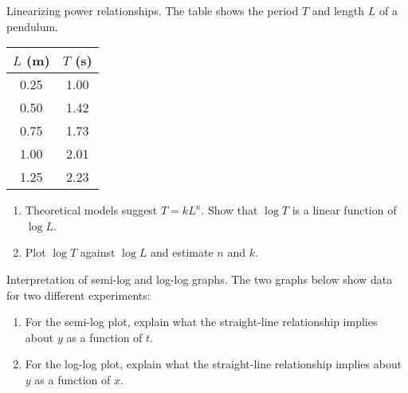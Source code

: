 \documentclass[11pt]{article}
\def\textbf#1{#1}%
\newcounter{question}
\begin{document}
\begin{question}
\textbf{Linearizing power relationships.}
The table shows the period $T$ and length $L$ of a pendulum.

\begin{center}
\begin{tabular}{c|c}
$L$ (m) & $T$ (s) \\
\hline
0.25 & 1.00 \\
0.50 & 1.42 \\
0.75 & 1.73 \\
1.00 & 2.01 \\
1.25 & 2.23
\end{tabular}
\end{center}

\begin{enumerate}
    \item Theoretical models suggest $T=kL^n$. Show that $\log T$ is a linear function of $\log L$.
    \item Plot $\log T$ against $\log L$ and estimate $n$ and $k$.
\end{enumerate}
\end{question}

\begin{question}
\textbf{Interpretation of semi-log and log-log graphs.}
The two graphs below show data for two different experiments:

\begin{center}
\end{center}

\begin{enumerate}
    \item For the semi-log plot, explain what the straight-line relationship implies about $y$ as a function of $t$.
    \item For the log-log plot, explain what the straight-line relationship implies about $y$ as a function of $x$.
\end{enumerate}
\end{question}
\end{document}
